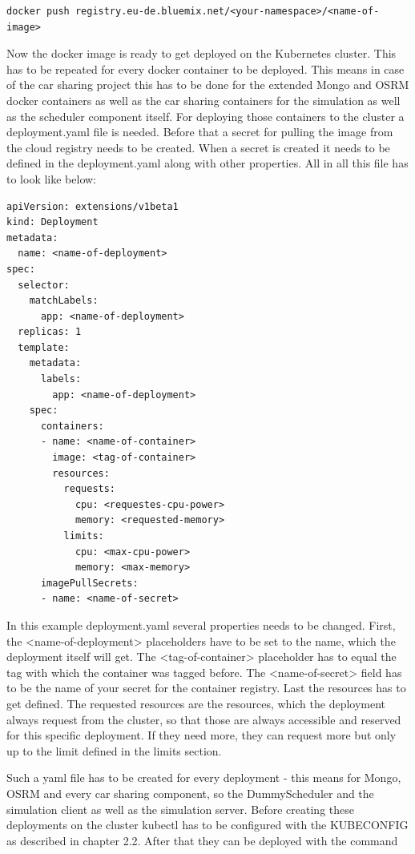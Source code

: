 \begin{lstlisting}
docker push registry.eu-de.bluemix.net/<your-namespace>/<name-of-image>
\end{lstlisting}

Now the docker image is ready to get deployed on the Kubernetes cluster. This has to be repeated for every docker container to be deployed. This means in case of the car sharing project this has to be done for the extended Mongo and OSRM docker containers as well as the car sharing containers for the simulation as well as the scheduler component itself. For deploying those containers to the cluster a deployment.yaml file is needed. Before that a secret for pulling the image from the cloud registry needs to be created. When a secret is created it needs to be defined in the deployment.yaml along with other properties. All in all this file has to look like below:

\begin{lstlisting}
apiVersion: extensions/v1beta1
kind: Deployment
metadata:
  name: <name-of-deployment>
spec:
  selector:
    matchLabels:
      app: <name-of-deployment>
  replicas: 1
  template:
    metadata:
      labels:
        app: <name-of-deployment>
    spec:
      containers:
      - name: <name-of-container>
        image: <tag-of-container>
        resources:
          requests:
            cpu: <requestes-cpu-power>
            memory: <requested-memory>
          limits:
            cpu: <max-cpu-power>
            memory: <max-memory>
      imagePullSecrets:
      - name: <name-of-secret>
\end{lstlisting}

In this example deployment.yaml several properties needs to be changed. First, the <name-of-deployment> placeholders have to be set to the name, which the deployment itself will get. The <tag-of-container> placeholder has to equal the tag with which the container was tagged before. The <name-of-secret> field has to be the name of your secret for the container registry. Last the resources has to get defined. The requested resources are the resources, which the deployment always request from the cluster, so that those are always accessible and reserved for this specific deployment. If they need more, they can request more but only up to the limit defined in the limits section.

Such a yaml file has to be created for every deployment - this means for Mongo, OSRM and every car sharing component, so the DummyScheduler and the simulation client as well as the simulation server. Before creating these deployments on the cluster kubectl has to be configured with the KUBECONFIG as described in chapter 2.2. After that they can be deployed with the command

